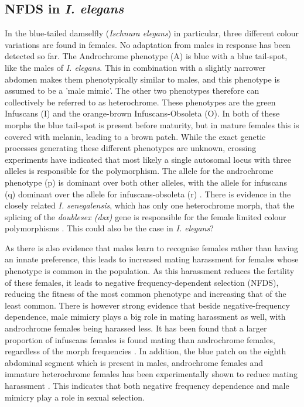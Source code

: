 \documentclass{article}
\begin{document}
\subsection{NFDS in \textit{I. elegans}}
In the blue-tailed damselfly (\textit{Ischnura elegans}) in particular, three different colour variations are found in females. No adaptation from males in response has been detected so far. The Androchrome phenotype (A) is blue with a blue tail-spot, like the males of \textit{I. elegans}. This in combination with a slightly narrower abdomen makes them phenotypically similar to males, and this phenotype is assumed to be a 'male mimic'. The other two phenotypes therefore can collectively be referred to as heterochrome. These phenotypes are the green Infuscans (I) and the orange-brown Infuscans-Obsoleta (O). In both of these morphs the blue tail-spot is present before maturity, but in mature females this is covered with melanin, leading to a brown patch. While the exact genetic processes generating these different phenotypes are unknown, crossing experiments have indicated that most likely a single autosomal locus with three alleles is responsible for the polymorphism\cite{Cordero1990}. The allele for the androchrome phenotype (p) is dominant over both other alleles, with the allele for infuscans (q) dominant over the allele for infuscans-obsoleta (r) \cite{Cordero1990}. There is evidence in the closely related \textit{I. senegalensis}, which has only one heterochrome morph, that the splicing of the \textit{doublesex (dsx)} gene is responsible for the female limited colour polymorphisms \cite{Takahashi2019}. This could also be the case in \textit{I. elegans}?

As there is also evidence that males learn to recognise females rather than having an innate preference, this leads to increased mating harassment for females whose phenotype is common in the population. As this harassment reduces the fertility of these females, it leads to negative frequency-dependent selection (NFDS), reducing the fitness of the most common phenotype and increasing that of the least common.
There is however strong evidence that beside negative-frequency dependence, male mimicry plays a big role in mating harassment as well, with androchrome females being harassed less. It has been found that a larger proportion of infuscans females is found mating than androchrome females, regardless of the morph frequencies \cite{Gosden2009}. In addition, the blue patch on the eighth abdominal segment which is present in males, androchrome females and immature heterochrome females has been experimentally shown to reduce mating harassment \cite{Willink2019}. This indicates that both negative frequency dependence and male mimicry play a role in sexual selection.
\end{document}
